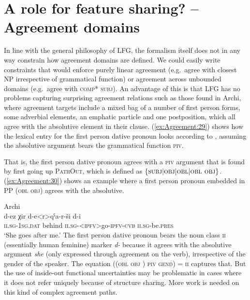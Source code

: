 \documentclass[output=paper,hidelinks]{langscibook}
\begin{document}
\section{A role for feature sharing? -- Agreement domains}\label{sec:domains}
In line with the general philosophy of LFG, the formalism itself does
not in any way constrain how agreement domains are defined. We could
easily write constraints that would enforce purely linear agreement
(e.g.\ agree with closest NP irrespective of grammatical function) or
agreement across unbounded domains (e.g.\ agree with \textsc{comp*
  subj}). An advantage of this is that LFG has no problems capturing
surprising agreement relations such as those found in Archi, where
agreement targets include a mixed bag of a number of first person
forms, some adverbial elements, an emphatic particle and one
postposition, which all agree with the absolutive element in their clause. (\ref{ex:Agreement:29})
shows how the lexical entry for the first person dative pronoun looks
according to \citet{sadler16}, assuming the absolutive argument
bears the grammatical function \textsc{piv}.

\ea\label{ex:Agreement:29}
\z
That is, the first person dative pronoun agrees with a \textsc{piv}
argument that is found by first going up \textsc{PathOut}, which is
defined as $\{\textsc{subj}|\textsc{obj}|\textsc{obl}|\textsc{obl
  obj}\}$. (\ref{ex:Agreement:30}) shows an example where a first person pronoun
embedded in PP (\textsc{obl obj}) agrees with the absolutive.

\ea\label{ex:Agreement:30} Archi\\
\gll d-ez χir d-e<r>qˁa-r-ši d-i \\
\textsc{ii.sg}-\textsc{1sg.dat} behind \textsc{ii.sg}-<\textsc{ipfv}>go-\textsc{ipfv}-\textsc{cvb} \textsc{ii.sg}-be.\textsc{pres} \\
\glt `She goes after me.'
\z
%
The first person dative pronoun bears the noun class \textsc{ii}
(essentially human feminine) marker \textit{d-} because it agrees with
the absolutive argument \textit{she} (only expressed through agreement
on the verb), irrespective of the gender of the speaker. The equation
((\textsc{obl obj} \UP) \textsc{piv gend}) = \textsc{ii} captures
that. But the use of inside-out functional uncertainties may be
problematic in cases where it does not refer uniquely because of
structure sharing. More work is needed on this kind of complex
agreement paths.
\end{document}
